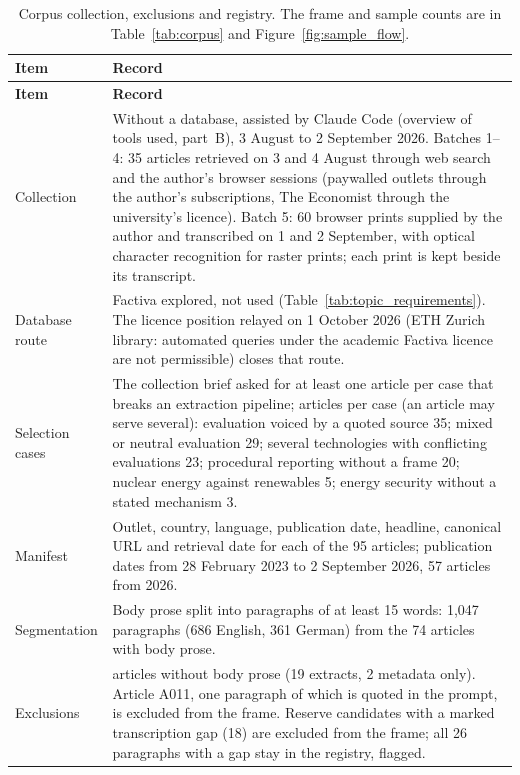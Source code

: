 \begingroup\scriptsize
\setlength{\tabcolsep}{4pt}
\begin{longtable}{@{}>{\raggedright\arraybackslash}p{30mm}>{\raggedright\arraybackslash}p{124mm}@{}}
\caption[Corpus collection, exclusions and registry]{Corpus collection, exclusions and registry. The frame and sample counts are in Table~\ref{tab:corpus} and Figure~\ref{fig:sample_flow}.}\label{tab:corpus_facts} \\
\toprule
\textbf{Item} & \textbf{Record} \\
\midrule
\endfirsthead
\toprule
\textbf{Item} & \textbf{Record} \\
\midrule
\endhead
\bottomrule
\endfoot
Collection & Without a database, assisted by Claude Code (overview of tools used, part~B), 3 August to 2 September 2026. Batches 1--4: 35 articles retrieved on 3 and 4 August through web search and the author's browser sessions (paywalled outlets through the author's subscriptions, The Economist through the university's licence). Batch 5: 60 browser prints supplied by the author and transcribed on 1 and 2 September, with optical character recognition for raster prints; each print is kept beside its transcript. \\
Database route & Factiva explored, not used (Table~\ref{tab:topic_requirements}). The licence position relayed on 1 October 2026 (ETH Zurich library: automated queries under the academic Factiva licence are not permissible) closes that route. \\
Selection cases & The collection brief asked for at least one article per case that breaks an extraction pipeline; articles per case (an article may serve several): evaluation voiced by a quoted source 35; mixed or neutral evaluation 29; several technologies with conflicting evaluations 23; procedural reporting without a frame 20; nuclear energy against renewables 5; energy security without a stated mechanism 3. \\
Manifest & Outlet, country, language, publication date, headline, canonical URL and retrieval date for each of the 95 articles; publication dates from 28 February 2023 to 2 September 2026, 57 articles from 2026. \\
Segmentation & Body prose split into paragraphs of at least 15 words: 1,047 paragraphs (686 English, 361 German) from the 74 articles with body prose. \\
Exclusions & 21 articles without body prose (19 extracts, 2 metadata only). Article A011, one paragraph of which is quoted in the prompt, is excluded from the frame. Reserve candidates with a marked transcription gap (18) are excluded from the frame; all 26 paragraphs with a gap stay in the registry, flagged. \\

\end{longtable}
